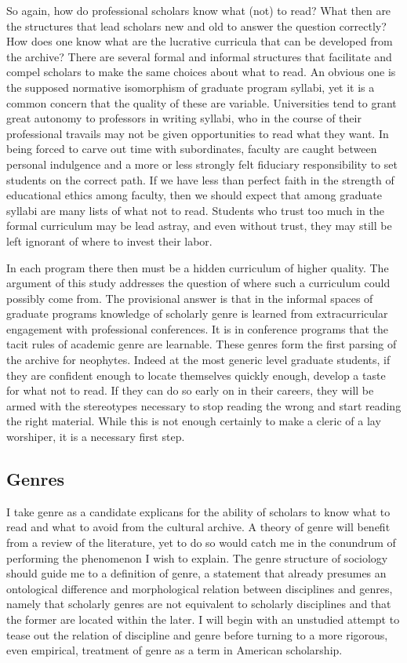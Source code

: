 \documentclass[]{book}
\theoremstyle{definition}
\theoremstyle{definition}
\theoremstyle{definition}
\theoremstyle{remark}
\begin{document}
So again, how do professional scholars know what (not) to read? What
then are the structures that lead scholars new and old to answer the
question correctly? How does one know what are the lucrative curricula
that can be developed from the archive? There are several formal and
informal structures that facilitate and compel scholars to make the same
choices about what to read. An obvious one is the supposed normative
isomorphism of graduate program syllabi, yet it is a common concern that
the quality of these are variable. Universities tend to grant great
autonomy to professors in writing syllabi, who in the course of their
professional travails may not be given opportunities to read what they
want. In being forced to carve out time with subordinates, faculty are
caught between personal indulgence and a more or less strongly felt
fiduciary responsibility to set students on the correct path. If we have
less than perfect faith in the strength of educational ethics among
faculty, then we should expect that among graduate syllabi are many
lists of what not to read. Students who trust too much in the formal
curriculum may be lead astray, and even without trust, they may still be
left ignorant of where to invest their labor.

In each program there then must be a hidden curriculum of higher
quality. The argument of this study addresses the question of where such
a curriculum could possibly come from. The provisional answer is that in
the informal spaces of graduate programs knowledge of scholarly genre is
learned from extracurricular engagement with professional conferences.
It is in conference programs that the tacit rules of academic genre are
learnable. These genres form the first parsing of the archive for
neophytes. Indeed at the most generic level graduate students, if they
are confident enough to locate themselves quickly enough, develop a
taste for what not to read. If they can do so early on in their careers,
they will be armed with the stereotypes necessary to stop reading the
wrong and start reading the right material. While this is not enough
certainly to make a cleric of a lay worshiper, it is a necessary first
step.

\hypertarget{genres}{%
\subsection{Genres}\label{genres}}

I take genre as a candidate explicans for the ability of scholars to
know what to read and what to avoid from the cultural archive. A theory
of genre will benefit from a review of the literature, yet to do so
would catch me in the conundrum of performing the phenomenon I wish to
explain. The genre structure of sociology should guide me to a
definition of genre, a statement that already presumes an ontological
difference and morphological relation between disciplines and genres,
namely that scholarly genres are not equivalent to scholarly disciplines
and that the former are located within the later. I will begin with an
unstudied attempt to tease out the relation of discipline and genre
before turning to a more rigorous, even empirical, treatment of genre as
a term in American scholarship.
\end{document}
